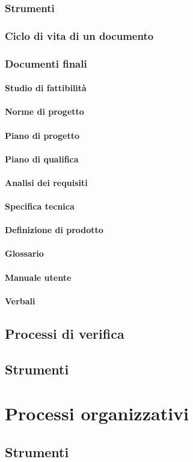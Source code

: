 		\subsubsection{Strumenti}
		\subsubsection{Ciclo di vita di un documento}
		\subsubsection{Documenti finali}
			\paragraph{Studio di fattibilità}
			\paragraph{Norme di progetto}
			\paragraph{Piano di progetto}
			\paragraph{Piano di qualifica}
			\paragraph{Analisi dei requisiti}
			\paragraph{Specifica tecnica}
			\paragraph{Definizione di prodotto}
			\paragraph{Glossario}
			\paragraph{Manuale utente}
			\paragraph{Verbali}
	\subsection{Processi di verifica}
	\subsection{Strumenti}
\section{Processi organizzativi}
	\subsection{Strumenti}

